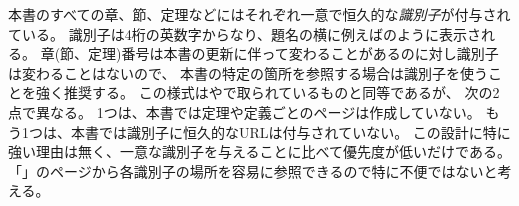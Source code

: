 \documentclass[index]{subfiles}
\begin{document}

本書のすべての章、節、定理などにはそれぞれ一意で恒久的な\emph{識別子}が付与されている。
識別子は4桁の英数字からなり、題名の横に例えばのように表示される。
章(節、定理)番号は本書の更新に伴って変わることがあるのに対し識別子は変わることはないので、
本書の特定の箇所を参照する場合は識別子を使うことを強く推奨する。
この様式はやで取られているものと同等であるが、
次の2点で異なる。
1つは、本書では定理や定義ごとのページは作成していない。
もう1つは、本書では識別子に恒久的なURLは付与されていない。
この設計に特に強い理由は無く、一意な識別子を与えることに比べて優先度が低いだけである。
「\hyperlink{ListOfNodes}{\myNodeIndexTitle}」のページから各識別子の場所を容易に参照できるので特に不便ではないと考える。
\end{document}
